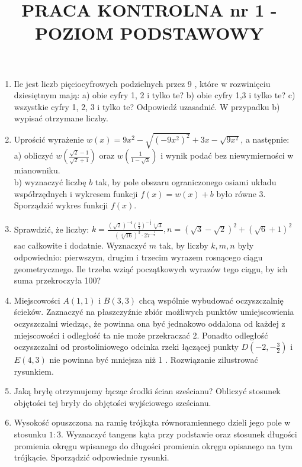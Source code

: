 \documentclass[10pt]{article}
\title{PRACA KONTROLNA nr 1 - POZIOM PODSTAWOWY }
\author{}
\date{}
\begin{document}
\maketitle
\begin{enumerate}
  \item Ile jest liczb pięciocyfrowych podzielnych przez 9 , które w rozwinięciu dziesiętnym mają: a) obie cyfry 1, 2 i tylko te? b) obie cyfry 1,3 i tylko te? c) wszystkie cyfry 1, 2, 3 i tylko te? Odpowiedź uzasadnić. W przypadku b) wypisać otrzymane liczby.
  \item Uprościć wyrażenie $w(x)=9 x^{2}-\sqrt{\left(-9 x^{2}\right)^{2}}+3 x-\sqrt{9 x^{2}}$, a następnie:\\
a) obliczyć $w\left(\frac{\sqrt{2}-1}{\sqrt{2}+1}\right)$ oraz $w\left(\frac{1}{1-\sqrt{3}}\right)$ i wynik podać bez niewymierności w mianowniku.\\
b) wyznaczyć liczbę $b$ tak, by pole obszaru ograniczonego osiami układu współrzędnych i wykresem funkcji $f(x)=w(x)+b$ było równe 3. Sporządzić wykres funkcji $f(x)$.
  \item Sprawdzić, że liczby: $k=\frac{(\sqrt{2})^{-4}\left(\frac{1}{4}\right)^{-\frac{5}{2}} \sqrt[4]{3}}{(\sqrt[4]{16})^{3} \cdot 27^{-\frac{1}{4}}}, n=(\sqrt{3}-\sqrt{2})^{2}+(\sqrt{6}+1)^{2}$ sac całkowite i dodatnie. Wyznaczyć $m$ tak, by liczby $k, m, n$ były odpowiednio: pierwszym, drugim i trzecim wyrazem rosnącego ciągu geometrycznego. Ile trzeba wziąć początkowych wyrazów tego ciągu, by ich suma przekroczyła 100?
  \item Miejscowości $A(1,1)$ i $B(3,3)$ chcą wspólnie wybudować oczyszczalnię ścieków. Zaznaczyć na płaszczyźnie zbiór możliwych punktów umiejscowienia oczyszczalni wiedząc, że powinna ona być jednakowo oddalona od każdej z miejscowości i odległość ta nie może przekraczać 2. Ponadto odległość oczyszczalni od prostoliniowego odcinka rzeki łączącej punkty $D\left(-2,-\frac{3}{2}\right)$ i $E(4,3)$ nie powinna być mniejsza niż 1 . Rozwiązanie zilustrować rysunkiem.
  \item Jaką bryłę otrzymujemy łącząc środki ścian sześcianu? Obliczyć stosunek objętości tej bryły do objętości wyjściowego sześcianu.
  \item Wysokość opuszczona na ramię trójkąta równoramiennego dzieli jego pole w stosunku $1: 3$. Wyznaczyć tangens kąta przy podstawie oraz stosunek długości promienia okręgu wpisanego do długości promienia okręgu opisanego na tym trójkącie. Sporządzić odpowiednie rysunki.
\end{enumerate}
\end{document}
